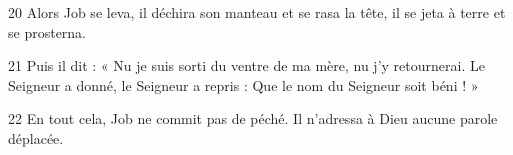 
20 Alors Job se leva, il déchira son manteau et se rasa la tête, il se jeta à terre et se prosterna.

21 Puis il dit : « Nu je suis sorti du ventre de ma mère, nu j’y retournerai. Le Seigneur a donné, le Seigneur a repris : Que le nom du Seigneur soit béni ! »

22 En tout cela, Job ne commit pas de péché. Il n’adressa à Dieu aucune parole déplacée.